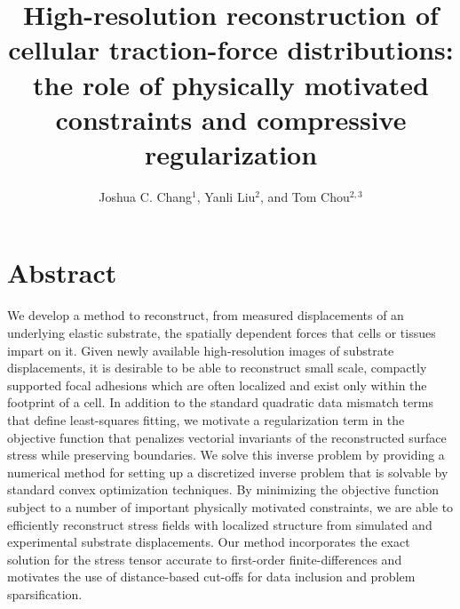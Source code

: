 \documentclass[aps,prl,reprint,groupedaddress,twocolumn]{revtex4-1}
\begin{document}
\title{High-resolution reconstruction of cellular traction-force
  distributions: the role of physically motivated constraints and
  compressive regularization}


\author{Joshua C. Chang$^{1}$, Yanli Liu$^{2}$, and Tom Chou$^{2,3}$}
 

\maketitle 


\section{Abstract}

We develop a method to reconstruct, from measured displacements of an
underlying elastic substrate, the spatially dependent forces that
cells or tissues impart on it.  Given newly available high-resolution
images of substrate displacements, it is desirable to be able to
reconstruct small scale, compactly supported focal adhesions which are
often localized and exist only within the footprint of a cell.  In
addition to the standard quadratic data mismatch terms that define
least-squares fitting, we motivate a regularization term in the
objective function that penalizes vectorial invariants of the
reconstructed surface stress while preserving boundaries.  We solve
this inverse problem by providing a numerical method for setting up a
discretized inverse problem that is solvable by standard convex
optimization techniques. By minimizing the objective function subject
to a number of important physically motivated constraints, we are able
to efficiently reconstruct stress fields with localized structure from
simulated and experimental substrate displacements.  Our method
incorporates the exact solution for the stress tensor accurate to
first-order finite-differences and motivates the use of distance-based
cut-offs for data inclusion and problem sparsification.
\end{document}
